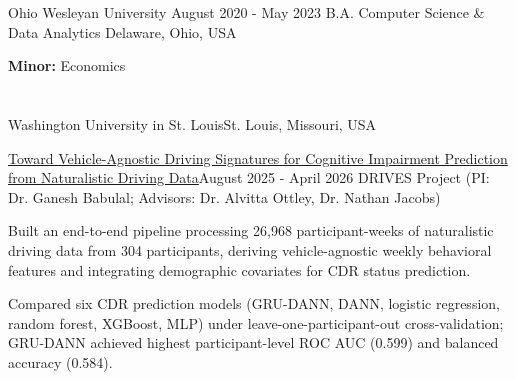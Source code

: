 \documentclass[10pt, letterpaper]{article}
\begin{document}
\begin{educationentry}
	{Ohio Wesleyan University} %
	{August 2020 - May 2023} %
	{B.A. Computer Science \& Data Analytics} %
	{Delaware, Ohio, USA} %
\begin{highlightsforbulletentries}
\item \textbf{Minor:} Economics
\end{highlightsforbulletentries}
\end{educationentry}

\vspace{\headerSpacing}

\section{}

\begin{leadershipentry}{Washington University in St. Louis}{St. Louis, Missouri, USA}
	\begin{researchentry}{\href{https://openscholarship.wustl.edu/eng_etds/1341/}{Toward Vehicle-Agnostic Driving Signatures for Cognitive Impairment Prediction from Naturalistic Driving Data}}{August 2025 - April 2026}
		DRIVES Project (PI: Dr. Ganesh Babulal; Advisors: Dr. Alvitta Ottley, Dr. Nathan Jacobs)
		\begin{highlightsforbulletentries}
		\item Built an end-to-end pipeline processing 26,968 participant-weeks of naturalistic driving data from 304 participants, deriving vehicle-agnostic weekly behavioral features and integrating demographic covariates for CDR status prediction.
		\item Compared six CDR prediction models (GRU-DANN, DANN, logistic regression, random forest, XGBoost, MLP) under leave-one-participant-out cross-validation; GRU-DANN achieved highest participant-level ROC AUC (0.599) and balanced accuracy (0.584).
		\end{highlightsforbulletentries}
	\end{researchentry}
\end{leadershipentry}
\end{document}
